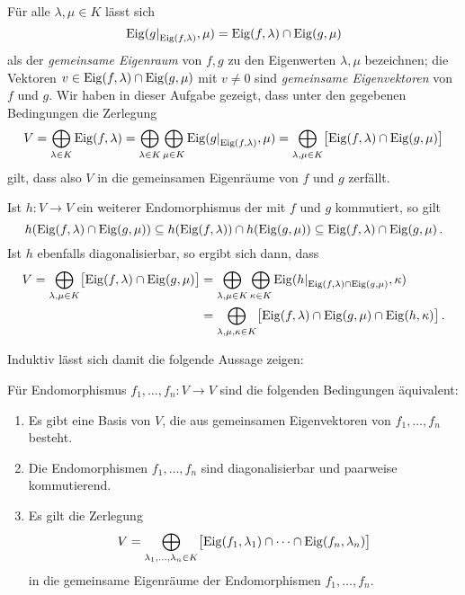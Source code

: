 \section{}

Für alle $\lambda, \mu \in K$ lässt sich
\[
    \eigenspace{ \restrict{g}{\eigenspace{f}{\lambda}} }{\mu}
  = \eigenspace{f}{\lambda} \cap \eigenspace{g}{\mu}
\]
als der \emph{gemeinsame Eigenraum} von $f, g$ zu den Eigenwerten $\lambda, \mu$ bezeichnen;
die Vektoren $v \in \operatorname{Eig}(f, \lambda) \cap \operatorname{Eig}(g, \mu)$ mit $v \neq 0$ sind \emph{gemeinsame Eigenvektoren} von $f$ und $g$.
Wir haben in dieser Aufgabe gezeigt, dass unter den gegebenen Bedingungen die Zerlegung
\[
    V
  = \bigoplus_{\lambda \in K} \eigenspace{f}{\lambda}
  = \bigoplus_{\lambda \in K} \bigoplus_{\mu \in K} \eigenspace{ \restrict{g}{\eigenspace{f}{\lambda}} }{\mu}
  = \bigoplus_{\lambda, \mu \in K} \bigl[ \eigenspace{f}{\lambda} \cap \eigenspace{g}{\mu} \bigr]
\]
gilt, dass also $V$ in die gemeinsamen Eigenräume von $f$ und $g$ zerfällt.

Ist $h \colon V \to V$ ein weiterer Endomorphismus der mit $f$ und $g$ kommutiert, so gilt
\[
            h( \operatorname{Eig}(f, \lambda) \cap \operatorname{Eig}(g, \mu)  )
  \subseteq h(\operatorname{Eig}(f, \lambda)) \cap h(\operatorname{Eig}(g, \mu))
  \subseteq \operatorname{Eig}(f, \lambda) \cap \operatorname{Eig}(g, \mu) \,.
\]
Ist $h$ ebenfalls diagonalisierbar, so ergibt sich dann, dass
\begin{align*}
      V
   =  \bigoplus_{\lambda, \mu \in K} \bigl[ \eigenspace{f}{\lambda} \cap \eigenspace{g}{\mu} \bigr]
  &=  \bigoplus_{\lambda, \mu \in K}
      \bigoplus_{\kappa \in K}
      \eigenspace{ \restrict{h}{ \eigenspace{f}{\lambda} \cap \eigenspace{g}{\mu} } }{\kappa} \\
  &=  \bigoplus_{\lambda, \mu, \kappa \in K}
      \bigl[ \eigenspace{f}{\lambda} \cap \eigenspace{g}{\mu} \cap \eigenspace{h}{\kappa} \bigr] \,.
\end{align*}

Induktiv lässt sich damit die folgende Aussage zeigen:

\begin{proposition}
  \label{proposition: equivalent conditions for simultaneously diagonalizable}
  Für Endomorphismus $f_1, \dotsc, f_n \colon V \to V$ sind die folgenden Bedingungen äquivalent:
  \begin{enumerate}
    \item
      Es gibt eine Basis von $V$, die aus gemeinsamen Eigenvektoren von $f_1, \dotsc, f_n$ besteht.
    \item
      Die Endomorphismen $f_1, \dotsc, f_n$ sind diagonalisierbar und paarweise kommutierend.
    \item
      Es gilt die Zerlegung
      \[
          V
        = \bigoplus_{\lambda_1, \dotsc, \lambda_n \in K}
          \bigl[ \operatorname{Eig}(f_1, \lambda_1) \cap \dotsb \cap \operatorname{Eig}(f_n, \lambda_n) \bigr]
      \]
      in die gemeinsame Eigenräume der Endomorphismen $f_1, \dotsc, f_n$.
  \end{enumerate}
\end{proposition}

